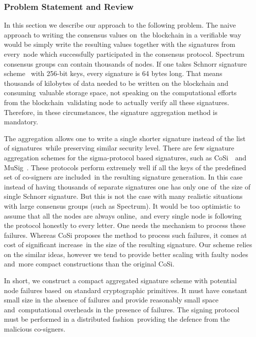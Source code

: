 \subsubsection{Problem Statement and Review}

In this section we describe our approach to the following problem.
The naive approach to writing the consensus values on\
the blockchain in a verifiable way would be simply write the resulting values together with the signatures from every\
node which successfully participated in the consensus protocol.
Spectrum consensus groups can contain thousands of nodes.
If one takes Schnorr signature scheme~\cite{Schnorr1991} with 256-bit keys, every signature is 64 bytes long.
That means thousands of kilobytes of data needed to be written on the blockchain and consuming\
valuable storage space, not speaking on the computational efforts from the blockchain\
validating node to actually verify all these signatures.
Therefore, in these circumstances, the signature aggregation method is mandatory.

The aggregation allows one to write a single shorter signature instead of the list of signatures\
while preserving similar security level.
There are few signature aggregation schemes for the sigma-protocol based signatures, such as CoSi~\cite{Syta2016}\
and MuSig~\cite{Itakura1983APC}.
These protocols perform extremely well if all the keys of the predefined set of co-signers are included\
in the resulting signature generation.
In this case instead of having thousands of separate signatures one has only one of\
the size of single Schnorr signature.
But this is not the case with many realistic situations with large consensus groups (such as Spectrum).
It would be too optimistic to assume that all the nodes are always online,\
and every single node is following the protocol honestly to every letter.
One needs the mechanism to process these failures.
Whereas CoSi proposes the method to process such failures, it comes at cost of significant increase\
in the size of the resulting signature.
Our scheme relies on the similar ideas, however we tend to provide better scaling with faulty nodes and\
more compact constructions than the original CoSi.

In short, we construct a compact aggregated signature scheme with potential node failures based\
on standard cryptographic primitives.
It must have constant small size in the absence of failures and provide reasonably small space and\
computational overheads in the presence of failures.
The signing protocol must be performed in a distributed fashion\
providing the defence from the malicious co-signers.

